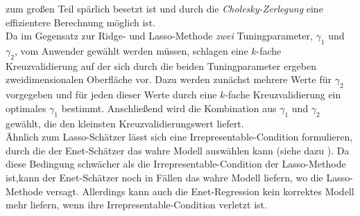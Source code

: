 \documentclass[12pt, a4paper]{report}\usepackage[]{graphicx}\usepackage[]{color}
\begin{document}
zum großen Teil spärlich besetzt ist und durch die \textit{Cholesky-Zerlegung} eine effizientere Berechnung möglich ist.\\
Da im Gegensatz zur Ridge- und Lasso-Methode \textit{zwei} Tuningparameter, $\gamma_1$ und $\gamma_2$, vom Anwender gewählt werden müssen, schlagen  eine $k$-fache Kreuzvalidierung auf der sich durch die beiden Tuningparameter ergeben zweidimensionalen Oberfläche vor. Dazu werden zunächst mehrere Werte für $\gamma_2$ vorgegeben und für jeden dieser Werte durch eine $k$-fache Kreuzvalidierung ein optimales $\gamma_1$ bestimmt. Anschließend wird die Kombination aus $\gamma_1$ und $\gamma_2$ gewählt, die den kleinsten Kreuzvalidierungswert liefert.\\
Ähnlich zum Lasso-Schätzer lässt sich eine Irrepresentable-Condition formulieren, durch die der Enet-Schätzer das wahre Modell auswählen kann (siehe dazu ). Da diese Bedingung schwächer als die Irrepresentable-Condition der Lasso-Methode ist,kann der Enet-Schätzer noch in Fällen das wahre Modell liefern, wo die Lasso-Methode versagt. Allerdings kann auch die Enet-Regression kein korrektes Modell mehr liefern, wenn ihre Irrepresentable-Condition verletzt ist.


\end{document}
